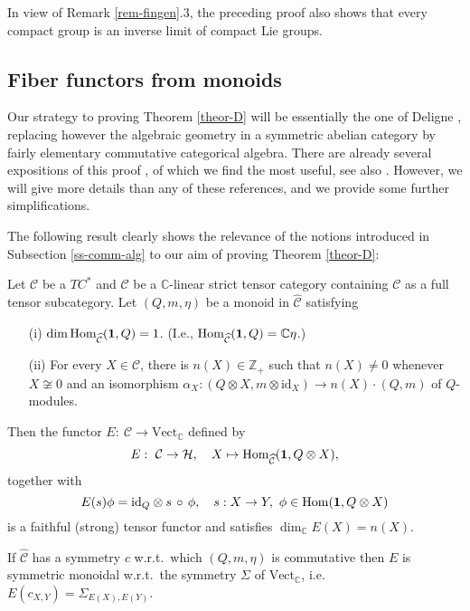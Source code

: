 \documentclass[11pt]{article}
\theoremstyle{definition}
\theoremstyle{definition}
\theoremstyle{remark}
\newcommand{\Vect}{\mathrm{Vect}}
\def\2#1{{\mathcal #1}}
\def\7#1{{\mathbb #1}}
\def\1#1{{\bf #1}}
\newcommand{\Hom}{\mathrm{Hom}}
\newcommand{\mcirc}{\,\circ\,}
\newcommand{\rarr}{\rightarrow}
\def\id{\mathrm{id}}
\begin{document}
\brem In view of Remark \ref{rem-fingen}.3, the preceding proof also
shows that every compact group is an inverse limit of compact Lie
groups.  \erem





\subsection{Fiber functors from monoids} \label{ss-monoid1}
 Our strategy to proving Theorem \ref{theor-D} will be
essentially the one of Deligne \cite{del}, replacing however the
algebraic geometry in a symmetric abelian category by fairly
elementary commutative categorical algebra. There are already several
expositions of this proof \cite{bichon,rosenb,phh}, of which we find
\cite{bichon} the most useful, see also \cite{bichon1}. However, we
will give more details than any of these references, and we provide
some further simplifications.

The following result clearly shows the relevance of the notions introduced in Subsection
\ref{ss-comm-alg} to our aim of proving Theorem \ref{theor-D}:

\bprop \label{prop-embed}  
Let $\2C$ be a $TC^*$ and $\widehat{\2C}$ be a $\7C$-linear strict tensor category containing $\2C$
as a full tensor subcategory. Let $(Q,m,\eta)$ be a monoid in $\widehat{\2C}$ satisfying
\begin{itemize}
\item[(i)] $\dim\Hom_{\widehat{\2C}}(\11,Q)=1$. (I.e., $\Hom_{\widehat{\2C}}(\11,Q)=\7C\eta$.)
\item[(ii)] For every $X\in\2C$, there is $n(X)\in\7Z_+$ such that $n(X)\ne 0$ whenever 
$X\not\cong 0$ and an isomorphism $\alpha_X:(Q\otimes X,m\otimes\id_X)\rarr n(X)\cdot(Q,m)$ of
$Q$-modules. 
\end{itemize}
Then the functor $E: \ \2C\rarr \Vect_\7C$ defined by 
\[ E: \ \2C\rarr\2H, \quad X\mapsto \Hom_{\widehat{\2C}}(\11,Q\otimes
X), \] together with
\begin{equation} \label{e-Emor}
E(s)\phi=\id_Q\otimes s\mcirc  \phi, \quad s:X\rarr Y,\ \phi\in\Hom(\11,Q\otimes X) 
\end{equation}
is a faithful (strong) tensor functor and satisfies $\dim_\7C E(X)=n(X)$.

If $\widehat{\2C}$ has a symmetry $c$ w.r.t.\ which $(Q,m,\eta)$ is
commutative then $E$ is symmetric monoidal w.r.t.\ the symmetry
$\Sigma$ of $\Vect_\7C$, i.e.\ $E(c_{X,Y})=\Sigma_{E(X),E(Y)}$.
\eprop
\end{document}
